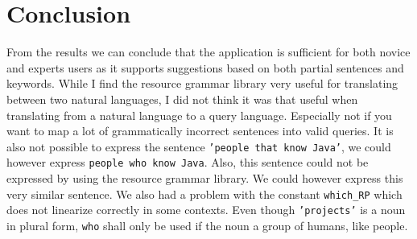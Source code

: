 \documentclass[
10pt, %
a4paper, %
oneside, %
headinclude,footinclude, %
BCOR5mm, %
]{scrartcl}
\begin{document}
\section{Conclusion}
From the results we can conclude that the application is sufficient for both novice and experts users as it supports suggestions based on both partial sentences and keywords.
\newline
\newline
While I find the resource grammar library very useful for translating between two natural languages, I did not think it was that useful when translating from a natural language to a query language. Especially not if you want to map a lot of grammatically incorrect sentences into valid queries.
\newline
\newline
It is also not possible to express the sentence \texttt{'people that know Java'}, we could however express \texttt{people who know Java}.
\newline
\newline
Also, this sentence could not be expressed by using the resource grammar library.
\newline
\newline
We could however express this very similar sentence.
\newline
\newline
We also had a problem with the constant \texttt{which\_RP} which does not linearize correctly in some contexts.
\newline
\newline
Even though \texttt{'projects'} is a noun in plural form, \texttt{who} shall only be used if the noun a group of humans, like people.
\end{document}
